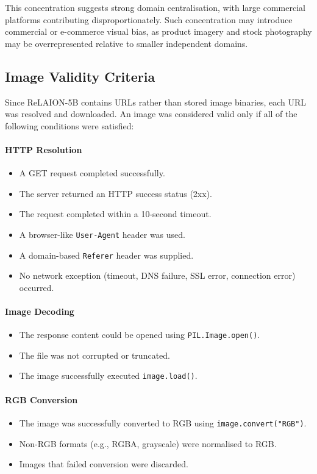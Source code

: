 This concentration suggests strong domain centralisation, with large commercial platforms contributing disproportionately. Such concentration may introduce commercial or e-commerce visual bias, as product imagery and stock photography may be overrepresented relative to smaller independent domains.

\subsection{Image Validity Criteria}

Since ReLAION-5B contains URLs rather than stored image binaries, each URL was resolved and downloaded. An image was considered valid only if all of the following conditions were satisfied:

\paragraph{HTTP Resolution}
\begin{itemize}
	\item A GET request completed successfully.
	\item The server returned an HTTP success status (2xx).
	\item The request completed within a 10-second timeout.
	\item A browser-like \texttt{User-Agent} header was used.
	\item A domain-based \texttt{Referer} header was supplied.
	\item No network exception (timeout, DNS failure, SSL error, connection error) occurred.
\end{itemize}

\paragraph{Image Decoding}
\begin{itemize}
	\item The response content could be opened using \texttt{PIL.Image.open()}.
	\item The file was not corrupted or truncated.
	\item The image successfully executed \texttt{image.load()}.
\end{itemize}

\paragraph{RGB Conversion}
\begin{itemize}
	\item The image was successfully converted to RGB using \texttt{image.convert("RGB")}.
	\item Non-RGB formats (e.g., RGBA, grayscale) were normalised to RGB.
	\item Images that failed conversion were discarded.
\end{itemize}

